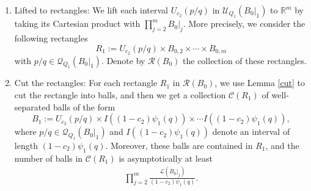 \documentclass[11pt]{amsart}
\numberwithin{equation}{section}
\newcommand{\R}{{\Bbb R}}
\newcommand{\0}{\mathbf{0}}
\theoremstyle{remark}
\def\R{\mathcal R}
\def\R{\mathbb R}
\begin{document}
{\begin{enumerate}
     $$1/2\cdot Q_1^2\textrm{ to }\psi(q).$$
    Then we form the corresponding annulus $A_{c_2}(p/q)$ from each shrunken ball. (We take $A_{c_2}(p/q)$ instead of $A_{c_1}(p/q)$ to count the set $\mathcal{N}_{Q_+,t}$ in Lemma \ref{count}.) These annuli are not only pairwise disjoint, but also disjoint from every ball of radius $c_1\psi(q)$ centered at rationals with denominator $Q_{1-m}\le q<Q_1$. Each annulus $A_{c_2}(p/q)$ is composed of two intervals. We select one of its two intervals arbitrarily and denote by $U_{c_2}(p/q)$. The collection of all such selected intervals is denoted by $\mathcal{U}_{Q_1}(B_0\vert_1)$.
    \item {Lifted to rectangles:} We lift each interval $U_{c_2}(p/q)$ in $\mathcal{U}_{Q_1}(B_0\vert_1)$ to $\R^m$ by taking its Cartesian product with $\prod_{j=2}^{m}B_0\vert_j$. 
    More precisely, we consider the following rectangles  $$R_{1}:=U_{c_2}(p/q)\times B_{0,2}\times\cdots\times B_{0,m}$$
    with $p/q\in \mathcal{Q}_{Q_1}(B_{0}\vert_1)$. Denote by $\mathcal{R}(B_0)$ the collection of these rectangles.
    \item Cut the rectangles: For each rectangle $R_1$ in $\mathcal{R}(B_0)$, we use Lemma \ref{cut} to cut the rectangle into balls, and then we get a collection $\mathcal{C}(R_{1})$ of well-separated balls of the form
    $$B_{1}:=U_{c_2}(p/q)\times I((1-c_2)\psi_1(q))\times\cdots I((1-c_2)\psi_1(q)),$$
    where $p/q\in \mathcal{Q}_{Q_1}(B_{0}\vert_1)$ and $I((1-c_2)\psi_1(q))$ denote an interval of length $(1-c_2)\psi_1(q)$. Moreover, these balls are contained in $R_{1}$, and the number of balls in $\mathcal{C}(R_{1})$ is asymptotically at least
    \begin{align}\label{est1}
        \prod_{j=2}^{m}\frac{\mathcal{L}(B_{0}\vert_j)}{(1-c_2)\psi_1(q)}.
        \end{align}


\end{enumerate}}
\end{document}
